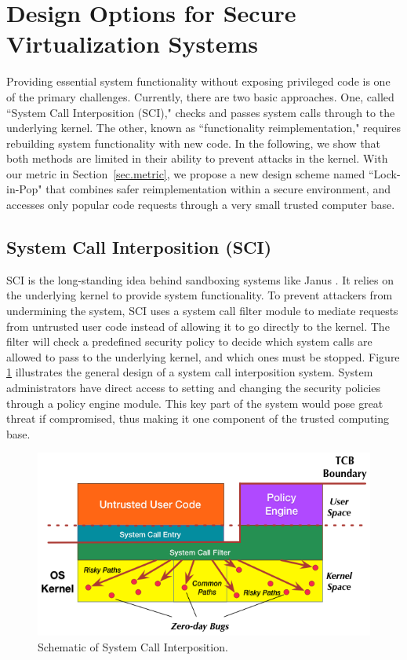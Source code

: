 \section{Design Options for Secure Virtualization Systems}
\label{sec.design}

Providing essential system functionality without exposing privileged code is one of the
primary challenges. 
Currently, there are two basic approaches.
One, called ``System Call Interposition (SCI)," checks and passes system calls
through to the underlying kernel. The other, known as ``functionality
reimplementation," requires rebuilding system functionality with new code. In the
following, we show that both methods are limited in their ability to
prevent attacks in the kernel. 
With our metric in Section~\ref{sec.metric}, 
we propose a new design scheme named ``Lock-in-Pop" that combines safer reimplementation
within a secure environment, and accesses only popular code requests through a
very small trusted computer base.


\subsection{System Call Interposition (SCI)}
SCI is the long-standing idea behind sandboxing systems like Janus
\cite{Janus0:96, Janus:99}. It relies on the underlying kernel
to provide system functionality. To prevent attackers from undermining the system,
SCI uses a system call filter module to mediate requests
from untrusted user code instead of allowing it to go directly to the kernel.
The filter will check a predefined security policy to decide which system calls are
allowed to pass to the underlying kernel, and which ones must be stopped.
Figure \ref{fig:design_system_call_interposition} illustrates the general design
of a system call interposition system. System administrators have direct access to 
setting and changing the security policies through a policy engine module. 
This key part of the system would pose great threat if compromised, thus making it 
one component of the trusted computing base. 

\begin{figure}%
\centering
\includegraphics[width=1.0\columnwidth]{diagram/Virtualization_Design_Model_03.png}
\caption{\small Schematic of System Call Interposition.}
\label{fig:design_system_call_interposition}
\end{figure}  

